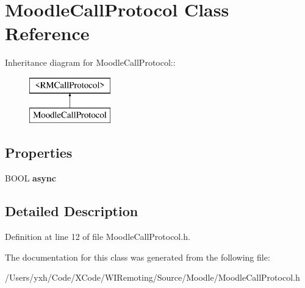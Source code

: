 \hypertarget{interface_moodle_call_protocol}{
\section{MoodleCallProtocol Class Reference}
\label{interface_moodle_call_protocol}
}
Inheritance diagram for MoodleCallProtocol::\begin{figure}[H]
\begin{center}
\leavevmode
\includegraphics[height=2cm]{interface_moodle_call_protocol}
\end{center}
\end{figure}
\subsection*{Properties}
\begin{DoxyCompactItemize}
\item 
\hypertarget{interface_moodle_call_protocol_a3fe33200850067bcaee321017d62a128}{
BOOL {\bfseries async}}
\label{interface_moodle_call_protocol_a3fe33200850067bcaee321017d62a128}

\end{DoxyCompactItemize}


\subsection{Detailed Description}


Definition at line 12 of file MoodleCallProtocol.h.

The documentation for this class was generated from the following file:\begin{DoxyCompactItemize}
\item 
/Users/yxh/Code/XCode/WIRemoting/Source/Moodle/MoodleCallProtocol.h\end{DoxyCompactItemize}
